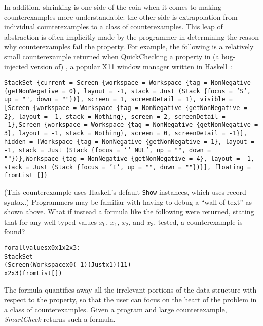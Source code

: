 \documentclass{sigplanconf}
\newenvironment{code}{\begin{alltt}\footnotesize}{\end{alltt}}
\newcommand{\ttp}[1]{\texttt{#1}}
\begin{document}
In addition, shrinking is one side of the coin when it comes to making
counterexamples more understandable: the other side is extrapolation from
individual counterexamples to a class of counterexamples.  This leap of
abstraction is often implicitly made by the programmer in determining the reason
why counterexamples fail the property.  For example, the following is a
relatively small counterexample returned when QuickChecking a property in (a
bug-injected version of) \xmonad, a popular X11 window manager written in
Haskell~\cite{xmonad}:
%
\medskip%
\begin{sloppypar}
\noindent%
\ttp{StackSet \{current = Screen \{workspace = Workspace \{tag = NonNegative
      \{getNonNegative = 0\}, layout = -1, stack = Just (Stack \{focus = 'S', up =
        "", down = ""\})\}, screen = 1, screenDetail = 1\}, visible = [Screen
    \{workspace = Workspace \{tag = NonNegative \{getNonNegative = 2\}, layout = -1,
        stack = Nothing\}, screen = 2, screenDetail = -1\},Screen \{workspace =
      Workspace \{tag = NonNegative \{getNonNegative = 3\}, layout = -1, stack =
        Nothing\}, screen = 0, screenDetail = -1\}], hidden = [Workspace \{tag =
      NonNegative \{getNonNegative = 1\}, layout = -1, stack = Just (Stack \{focus
        = `\char`\\NUL', up = "", down = ""\})\},Workspace \{tag = NonNegative
      \{getNonNegative = 4\}, layout = -1, stack = Just (Stack \{focus = 'I', up =
        "", down = ""\})\}], floating = fromList []\} }
\end{sloppypar}
\medskip%
\noindent
(This counterexample uses Haskell's default \ttp{Show} instances, which uses
record syntax.)  Programmers may be familiar with having to debug
a ``wall of text'' as shown above.  What if instead a
formula like the following were returned, stating that for any well-typed
values $x_0$, $x_1$, $x_2$, and $x_3$, tested, a counterexample is found?

%
\begin{samepage}
\begin{code}
forall values x0 x1 x2 x3:
  StackSet
    (Screen (Workspace x0 (-1) (Just x1)) 1 1)
    x2 x3 (fromList [])
\end{code}
\end{samepage}
%
\noindent
The formula quantifies away all the irrelevant portions of the data structure
with respect to the property, so that the user can focus on the heart of the
problem in a class of counterexamples.  Given a program and large
counterexample, \emph{SmartCheck} returns such a formula.
\end{document}
